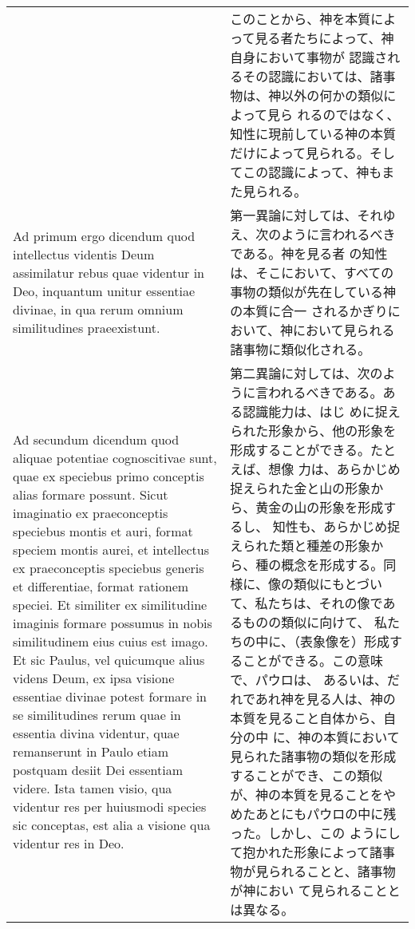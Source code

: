 \documentclass[10pt]{jsarticle} %
\begin{document}
\begin{longtable}{p{21em}p{21em}}
&

このことから、神を本質によって見る者たちによって、神自身において事物が
認識されるその認識においては、諸事物は、神以外の何かの類似によって見ら
れるのではなく、知性に現前している神の本質だけによって見られる。そし
てこの認識によって、神もまた見られる。

\\

{\sc  Ad primum ergo dicendum} quod intellectus videntis Deum
 assimilatur rebus quae videntur in Deo, inquantum unitur essentiae
 divinae, in qua rerum omnium similitudines praeexistunt.

&

第一異論に対しては、それゆえ、次のように言われるべきである。神を見る者
の知性は、そこにおいて、すべての事物の類似が先在している神の本質に合一
されるかぎりにおいて、神において見られる諸事物に類似化される。

\\

{\sc Ad secundum dicendum} quod aliquae potentiae cognoscitivae sunt,
quae ex speciebus primo conceptis alias formare possunt. Sicut
imaginatio ex praeconceptis speciebus montis et auri, format speciem
montis aurei, et intellectus ex praeconceptis speciebus generis et
differentiae, format rationem speciei. Et similiter ex similitudine
imaginis formare possumus in nobis similitudinem eius cuius est
imago. Et sic Paulus, vel quicumque alius videns Deum, ex ipsa visione
essentiae divinae potest formare in se similitudines rerum quae in
essentia divina videntur, quae remanserunt in Paulo etiam postquam
desiit Dei essentiam videre. Ista tamen visio, qua videntur res per
huiusmodi species sic conceptas, est alia a visione qua videntur res
in Deo.

&

第二異論に対しては、次のように言われるべきである。ある認識能力は、はじ
めに捉えられた形象から、他の形象を形成することができる。たとえば、想像
力は、あらかじめ捉えられた金と山の形象から、黄金の山の形象を形成するし、
知性も、あらかじめ捉えられた類と種差の形象から、種の概念を形成する。同
様に、像の類似にもとづいて、私たちは、それの像であるものの類似に向けて、
私たちの中に、（表象像を）形成することができる。この意味で、パウロは、
あるいは、だれであれ神を見る人は、神の本質を見ること自体から、自分の中
に、神の本質において見られた諸事物の類似を形成することができ、この類似
が、神の本質を見ることをやめたあとにもパウロの中に残った。しかし、この
ようにして抱かれた形象によって諸事物が見られることと、諸事物が神におい
て見られることとは異なる。

\end{longtable}
\end{document}
